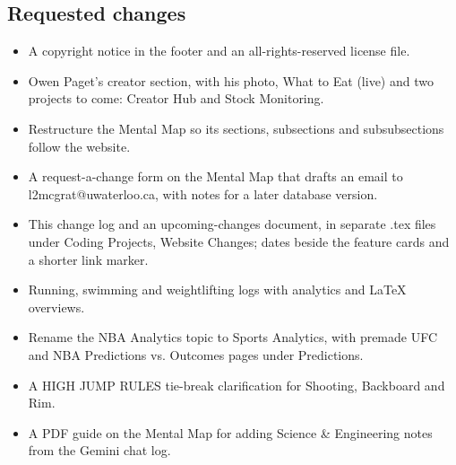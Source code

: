 \documentclass[11pt]{article}
\begin{document}
\subsection{Requested changes}
\begin{itemize}
\item A copyright notice in the footer and an all-rights-reserved license file.
\item Owen Paget's creator section, with his photo, What to Eat (live) and two projects to come: Creator Hub and Stock Monitoring.
\item Restructure the Mental Map so its sections, subsections and subsubsections follow the website.
\item A request-a-change form on the Mental Map that drafts an email to l2mcgrat@uwaterloo.ca, with notes for a later database version.
\item This change log and an upcoming-changes document, in separate .tex files under Coding Projects, Website Changes; dates beside the feature cards and a shorter link marker.
\item Running, swimming and weightlifting logs with analytics and LaTeX overviews.
\item Rename the NBA Analytics topic to Sports Analytics, with premade UFC and NBA Predictions vs. Outcomes pages under Predictions.
\item A HIGH JUMP RULES tie-break clarification for Shooting, Backboard and Rim.
\item A PDF guide on the Mental Map for adding Science \& Engineering notes from the Gemini chat log.
\end{itemize}
\end{document}
